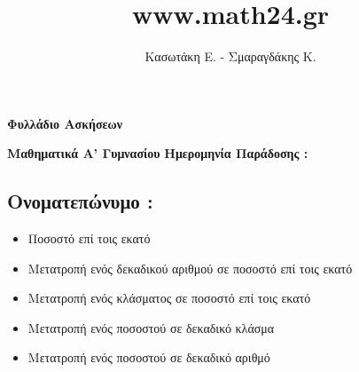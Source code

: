 \documentclass[a4paper,10pt]{report}
\author{Κασωτάκη Ε. - Σμαραγδάκης Κ.}
\title{www.math24.gr}
\begin{document}
\pagestyle{fancy}
\fancyhead{}
\fancyfoot{}
\renewcommand{\headrulewidth}{0pt}
\renewcommand{\footrulewidth}{0pt}


 
\begin{shaded}
\begin{center}
\huge \textbf{Φυλλάδιο Ασκήσεων}\\
\end{center} 
\textbf{Μαθηματικά Α' Γυμνασίου} \hfill \textbf{Ημερομηνία Παράδοσης : \hspace{2em} }
\subsection*{Ονοματεπώνυμο :\hfill  \hspace{5em}}
\end{shaded}
\vspace{2em}
\begin{itemize}
 \item Ποσοστό επί τοις εκατό
 \item Μετατροπή ενός δεκαδικού αριθμού σε ποσοστό επί τοις εκατό
 \item Μετατροπή ενός  κλάσματος σε ποσοστό επί τοις εκατό
 \item Μετατροπή ενός  ποσοστού σε δεκαδικό κλάσμα 
 \item Μετατροπή ενός  ποσοστού σε δεκαδικό αριθμό 
\end{itemize}
\end{document}
